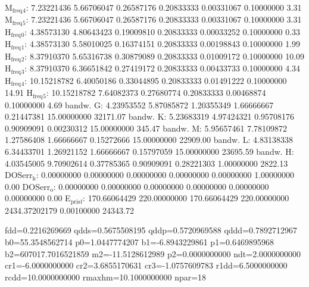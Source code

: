 \documentclass[11pt]{article}
\begin{document}
M\(_{\text{freq}}\)\(_{\text{4}}\):   7.23221436   5.66706047   0.26587176   0.20833333   0.00331067   0.10000000         3.31
M\(_{\text{freq}}\)\(_{\text{5}}\):   7.23221436   5.66706047   0.26587176   0.20833333   0.00331067   0.10000000         3.31
H\(_{\text{freq}}\)\(_{\text{0}}\):   4.38573130   4.80643423   0.19009810   0.20833333   0.00033252   0.10000000         0.33
H\(_{\text{freq}}\)\(_{\text{1}}\):   4.38573130   5.58010025   0.16374151   0.20833333   0.00198843   0.10000000         1.99
H\(_{\text{freq}}\)\(_{\text{2}}\):   8.37910370   5.65316738   0.30879089   0.20833333   0.01009172   0.10000000        10.09
H\(_{\text{freq}}\)\(_{\text{3}}\):   8.37910370   6.36651842   0.27419172   0.20833333   0.00433733   0.10000000         4.34
H\(_{\text{freq}}\)\(_{\text{4}}\):  10.15218782   6.40050186   0.33044895   0.20833333   0.01491222   0.10000000        14.91
H\(_{\text{freq}}\)\(_{\text{5}}\):  10.15218782   7.64082373   0.27680774   0.20833333   0.00468874   0.10000000         4.69
bandw. G:   4.23953552   5.87085872   1.20355349   1.66666667   0.21447381  15.00000000     32171.07
bandw. K:   5.23683319   4.97424321   0.95708176   0.90909091   0.00230312  15.00000000       345.47
bandw. M:   5.95657461   7.78109872   1.27586408   1.66666667   0.15272666  15.00000000     22909.00
bandw. L:   4.83138338   6.34433701   1.26921152   1.66666667   0.15797059  15.00000000     23695.59
bandw. H:   4.03545005   9.70902614   0.37785365   0.90909091   0.28221303   1.00000000      2822.13
DOSerr\(_{\text{h}}\):   0.00000000   0.00000000   0.00000000   0.00000000   0.00000000   1.00000000         0.00
DOSerr\(_{\text{o}}\):   0.00000000   0.00000000   0.00000000   0.00000000   0.00000000   0.00000000         0.00
E\(_{\text{pris}}\)\(_{\text{f}}\): 170.66064429 220.00000000 170.66064429 220.00000000 2434.37202179   0.00100000     24343.72

fdd=0.2216269669 qdds=0.5675508195 qddp=0.5720969588 qddd=0.7892712967 b0=55.3548562714 p0=1.0447774207 b1=-6.8943229861 p1=0.6469895968 b2=607017.7016521859 m2=-11.5128612989 p2=0.0000000000 ndt=2.0000000000 cr1=-6.0000000000 cr2=3.6855170631 cr3=-1.0757609783 r1dd=6.5000000000 rcdd=10.0000000000 rmaxhm=10.1000000000 npar=18 
\end{document}
